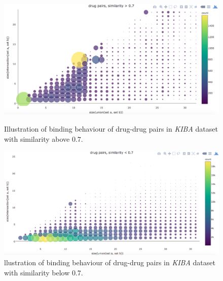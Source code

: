 \begin{figure}[p]
\begin{center}
\includegraphics[scale=0.36]{kiba_simi_above.png}
\end{center}
\caption[Correlation of drug-similarity and binding behaviour, similar drug pairs, \textit{KIBA} dataset]{Illustration of binding behaviour of drug-drug pairs in \textit{KIBA} dataset  with similarity above $0.7$.}
\label{fig:kiba_drug_simi_corr_1}
\begin{center}
\includegraphics[scale=0.36]{kiba_simi_below.png}
\end{center}
\caption[Correlation of drug-similarity and binding behaviour, un-similar drug pairs, \textit{KIBA} dataset]{llustration of binding behaviour of drug-drug pairs in \textit{KIBA} dataset  with similarity below $0.7$.}
\label{fig:kiba_drug_simi_corr_2}
\end{figure}

